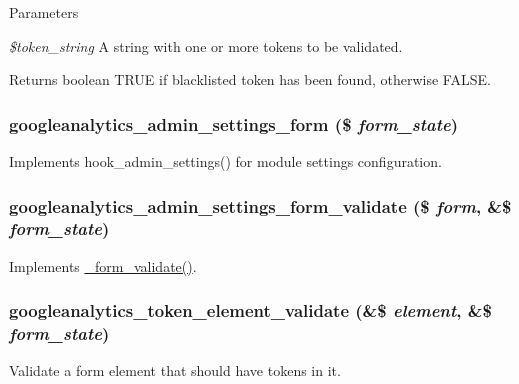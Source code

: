 \begin{DoxyParams}{Parameters}
\item[{\em \$token\_\-string}]A string with one or more tokens to be validated. \end{DoxyParams}
\begin{DoxyReturn}{Returns}
boolean TRUE if blacklisted token has been found, otherwise FALSE. 
\end{DoxyReturn}
\hypertarget{googleanalytics_8admin_8inc_abc6ca2b209feb9090c8ab26d6ca059c4}{
\subsubsection[{googleanalytics\_\-admin\_\-settings\_\-form}]{\setlength{\rightskip}{0pt plus 5cm}googleanalytics\_\-admin\_\-settings\_\-form (\$ {\em form\_\-state})}}
\label{googleanalytics_8admin_8inc_abc6ca2b209feb9090c8ab26d6ca059c4}
Implements hook\_\-admin\_\-settings() for module settings configuration. \hypertarget{googleanalytics_8admin_8inc_a41b564fb7aed5ae2811eddf2955eb13e}{
\subsubsection[{googleanalytics\_\-admin\_\-settings\_\-form\_\-validate}]{\setlength{\rightskip}{0pt plus 5cm}googleanalytics\_\-admin\_\-settings\_\-form\_\-validate (\$ {\em form}, \/  \&\$ {\em form\_\-state})}}
\label{googleanalytics_8admin_8inc_a41b564fb7aed5ae2811eddf2955eb13e}
Implements \hyperlink{group__form__api_ga464b4724506722d2a2d482df27736357}{\_\-form\_\-validate()}. \hypertarget{googleanalytics_8admin_8inc_a54d8df69a1b0518237288949dfbfdb42}{
\subsubsection[{googleanalytics\_\-token\_\-element\_\-validate}]{\setlength{\rightskip}{0pt plus 5cm}googleanalytics\_\-token\_\-element\_\-validate (\&\$ {\em element}, \/  \&\$ {\em form\_\-state})}}
\label{googleanalytics_8admin_8inc_a54d8df69a1b0518237288949dfbfdb42}
Validate a form element that should have tokens in it.

